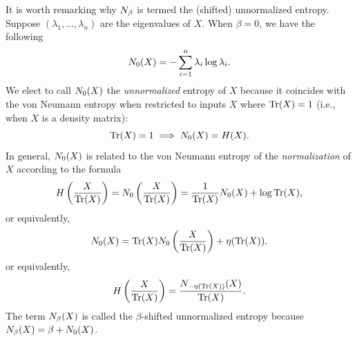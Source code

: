 \documentclass[notitlepage, 10pt]{article}
\begin{document}
\begin{rem}
    It is worth remarking why $N_{\beta}$ is termed the (shifted) unnormalized entropy.
    Suppose $(\lambda_1, \ldots, \lambda_n)$ are the eigenvalues of $X$.
    When $\beta = 0$, we have the following 
    \begin{equation}
        N_{0}(X) = - \sum_{i=1}^{n} \lambda_i \log \lambda_i.
    \end{equation}
    We elect to call $N_0(X)$ the \textit{unnormalized} entropy of $X$ because it coincides with the von Neumann entropy when restricted to inputs $X$ where $\operatorname{Tr}(X) = 1$ (i.e., when $X$ is a density matrix):
    \begin{equation}
        \operatorname{Tr}(X) = 1 \implies N_0(X) = H(X).
    \end{equation}
    In general, $N_{0}(X)$ is related to the von Neumann entropy of the \textit{normalization} of $X$ according to the formula
    \begin{equation}
        H\left(\frac{X}{\operatorname{Tr}(X)}\right) = N_{0}\left(\frac{X}{\operatorname{Tr}(X)}\right) = \frac{1}{\operatorname{Tr}(X)} N_0(X) + \log \operatorname{Tr}(X),
    \end{equation}
    or equivalently,
    \begin{equation}
        N_0(X) = \operatorname{Tr}(X)N_{0}\left(\frac{X}{\operatorname{Tr}(X)}\right) + \eta(\operatorname{Tr}(X)).
    \end{equation}
    or equivalently,
    \begin{equation}
        H\left(\frac{X}{\operatorname{Tr}(X)}\right) = \frac{N_{-\eta(\operatorname{Tr}(X))}(X)}{\operatorname{Tr}(X)}.
    \end{equation}
    The term $N_{\beta}(X)$ is called the $\beta$-shifted unnormalized entropy because $N_{\beta}(X) =\beta + N_0(X)$.
\end{rem}
\end{document}
